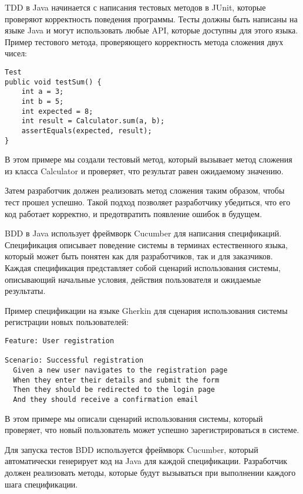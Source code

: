 TDD в Java начинается с написания тестовых методов в JUnit, которые проверяют корректность поведения программы. Тесты должны быть написаны на языке Java и могут использовать любые API, которые доступны для этого языка. Пример тестового метода, проверяющего корректность метода сложения двух чисел:

\begin{lstlisting}
Test
public void testSum() {
    int a = 3;
    int b = 5;
    int expected = 8;
    int result = Calculator.sum(a, b);
    assertEquals(expected, result);
}
\end{lstlisting}
В этом примере мы создали тестовый метод, который вызывает метод сложения из класса Calculator и проверяет, что результат равен ожидаемому значению.

Затем разработчик должен реализовать метод сложения таким образом, чтобы тест прошел успешно. Такой подход позволяет разработчику убедиться, что его код работает корректно, и предотвратить появление ошибок в будущем.

BDD в Java использует фреймворк Cucumber для написания спецификаций. Спецификация описывает поведение системы в терминах естественного языка, который может быть понятен как для разработчиков, так и для заказчиков. Каждая спецификация представляет собой сценарий использования системы, описывающий начальные условия, действия пользователя и ожидаемые результаты.

Пример спецификации на языке Gherkin для сценария использования системы регистрации новых пользователей:

\begin{lstlisting}
Feature: User registration

Scenario: Successful registration
  Given a new user navigates to the registration page
  When they enter their details and submit the form
  Then they should be redirected to the login page
  And they should receive a confirmation email
\end{lstlisting}
В этом примере мы описали сценарий использования системы, который проверяет, что новый пользователь может успешно зарегистрироваться в системе.

Для запуска тестов BDD используется фреймворк Cucumber, который автоматически генерирует код на Java для каждой спецификации. Разработчик должен реализовать методы, которые будут вызываться при выполнении каждого шага спецификации.